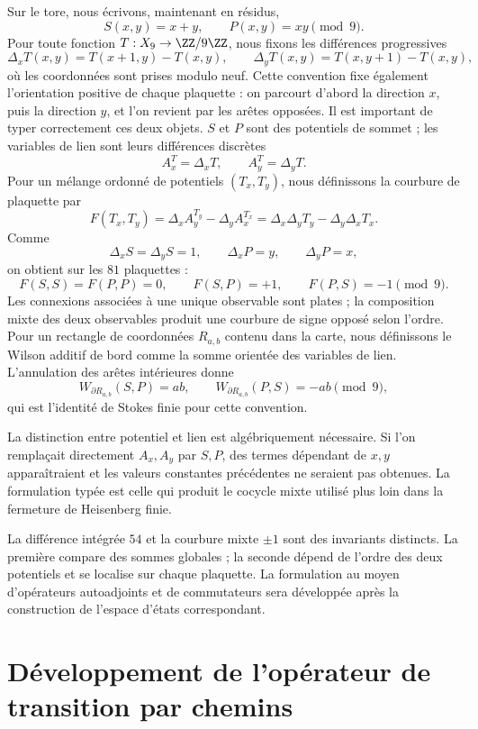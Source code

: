 Sur le tore, nous écrivons, maintenant en résidus,
\[
S(x,y)=x+y,
\qquad
P(x,y)=xy\pmod9.
\]
Pour toute fonction \(T:X_9\to\ZZ/9\ZZ\), nous fixons les différences progressives
\[
 \Delta_xT(x,y)=T(x+1,y)-T(x,y),\qquad
 \Delta_yT(x,y)=T(x,y+1)-T(x,y),
\]
où les coordonnées sont prises modulo neuf. Cette convention fixe également
l'orientation positive de chaque plaquette : on parcourt d'abord la direction
\(x\), puis la direction \(y\), et l'on revient par les arêtes opposées.
Il est important de typer correctement ces deux objets. \(S\) et \(P\) sont
des potentiels de sommet ; les variables de lien sont leurs différences
discrètes
\[
A_x^T=\Delta_xT,
\qquad
A_y^T=\Delta_yT.
\]
Pour un mélange ordonné de potentiels \((T_x,T_y)\), nous définissons la
courbure de plaquette par
\[
F(T_x,T_y)
=\Delta_x A_y^{T_y}-\Delta_y A_x^{T_x}
=\Delta_x\Delta_yT_y-\Delta_y\Delta_xT_x.
\]
Comme
\[
\Delta_xS=\Delta_yS=1,
\qquad
\Delta_xP=y,
\qquad
\Delta_yP=x,
\]
on obtient sur les \(81\) plaquettes :
\[
F(S,S)=F(P,P)=0,
\qquad
F(S,P)=+1,
\qquad
F(P,S)=-1\pmod9.
\]
Les connexions associées à une unique observable sont plates ; la composition
mixte des deux observables produit une courbure de signe opposé selon
l'ordre. Pour un rectangle de coordonnées \(R_{a,b}\) contenu
dans la carte, nous définissons le Wilson additif de bord comme la somme orientée des
variables de lien. L'annulation des arêtes intérieures donne
\[
 W_{\partial R_{a,b}}(S,P)=ab,\qquad
 W_{\partial R_{a,b}}(P,S)=-ab\pmod9,
\]
qui est l'identité de Stokes finie pour cette convention.

La distinction entre potentiel et lien est algébriquement nécessaire. Si l'on remplaçait
directement \(A_x,A_y\) par \(S,P\), des termes dépendant de
\(x,y\) apparaîtraient et les valeurs constantes précédentes ne seraient pas obtenues. La formulation
typée est celle qui produit le cocycle mixte utilisé plus loin dans la fermeture
de Heisenberg finie.

\begin{remark}
La différence intégrée \(54\) et la courbure mixte \(\pm1\) sont des invariants
distincts. La première compare des sommes globales ; la seconde dépend de l'ordre des
deux potentiels et se localise sur chaque plaquette. La formulation au moyen
d'opérateurs autoadjoints et de commutateurs sera développée après la construction de
l'espace d'états correspondant.
\end{remark}

\section{Développement de l'opérateur de transition par chemins}

